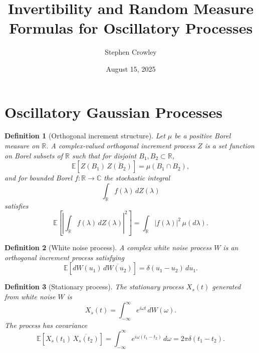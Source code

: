 \documentclass[12pt]{article}
\title{Invertibility and Random Measure Formulas for Oscillatory Processes}
\author{Stephen Crowley}
\date{August 15, 2025}
\theoremstyle{plain}
\newtheorem{definition}{Definition}
\begin{document}
\maketitle

\section{Oscillatory Gaussian Processes}

\begin{definition}[Orthogonal increment structure]\label{def:orthinc}
Let $\mu$ be a positive Borel measure on $\mathbb{R}$. A complex-valued orthogonal increment process $Z$ is a set function on Borel subsets of $\mathbb{R}$ such that for disjoint $B_1,B_2\subset\mathbb{R}$,
\begin{equation}
\mathbb{E}[Z(B_1)\,\overline{Z(B_2)}] = \mu(B_1\cap B_2),
\end{equation}
and for bounded Borel $f:\mathbb{R}\to\mathbb{C}$ the stochastic integral
\begin{equation}
\int_{\mathbb{R}} f(\lambda)\,dZ(\lambda)
\end{equation}
satisfies
\begin{equation}
\mathbb{E}\!\left[\left|\int_{\mathbb{R}} f(\lambda)\,dZ(\lambda)\right|^2\right]
= \int_{\mathbb{R}} |f(\lambda)|^2\,\mu(d\lambda).
\end{equation}
\end{definition}

\begin{definition}[White noise process]\label{def:whitenoise}
A complex white noise process $W$ is an orthogonal increment process satisfying
\begin{equation}
\mathbb{E}[dW(u_1)\,\overline{dW(u_2)}] = \delta(u_1-u_2) \, du_1.
\end{equation}
\end{definition}

\begin{definition}[Stationary process]\label{def:stationary}
The stationary process $X_s(t)$ generated from white noise $W$ is
\begin{equation}\label{eq:stationary-rep}
X_s(t) = \int_{-\infty}^\infty e^{i\omega t} \, dW(\omega).
\end{equation}
The process has covariance
\begin{equation}
\mathbb{E}[X_s(t_1)\,\overline{X_s(t_2)}] = \int_{-\infty}^\infty e^{i\omega(t_1-t_2)} \, d\omega = 2\pi\delta(t_1-t_2).
\end{equation}
\end{definition}
\end{document}

